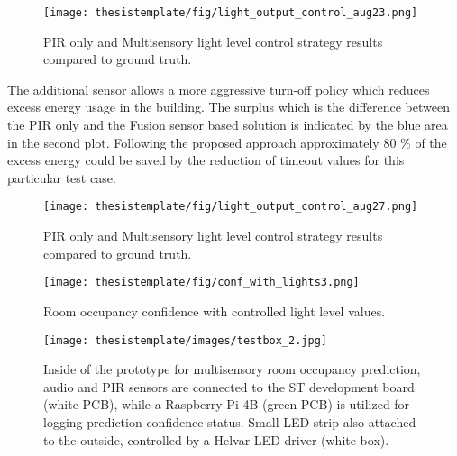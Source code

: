 \begin{figure}[ht!]
  \begin{center}
    \texttt{[image: thesistemplate/fig/light\_output\_control\_aug23.png]}
    \caption{PIR only and Multisensory light level control strategy results compared to ground truth.}
    \label{fig:light_output_comp}
  \end{center}
\end{figure}

The additional sensor allows a more aggressive turn-off policy which reduces excess energy usage in the building. The surplus which is the difference between the PIR only and the Fusion sensor based solution is indicated by the blue area in the second plot. Following the proposed approach approximately 80 \% of the excess energy could be saved by the reduction of timeout values for this particular test case.

\begin{figure}[ht!]
  \begin{center}
    \texttt{[image: thesistemplate/fig/light\_output\_control\_aug27.png]}
    \caption{PIR only and Multisensory light level control strategy results compared to ground truth.}
    \label{fig:light_output_comp}
  \end{center}
\end{figure}


\begin{figure}[h!]
  \begin{center}
    \texttt{[image: thesistemplate/fig/conf\_with\_lights3.png]}
    \caption{Room occupancy confidence with controlled light level values.}
    \label{fig:conf_with_lights}
  \end{center}
\end{figure}




\begin{figure}[ht!]
  \begin{center}
    \texttt{[image: thesistemplate/images/testbox\_2.jpg]}
    \caption{Inside of the prototype for multisensory room occupancy prediction, audio and PIR sensors are connected to the ST development board (white PCB), while a Raspberry Pi 4B (green PCB) is utilized for logging prediction confidence status. Small LED strip also attached to the outside, controlled by a Helvar LED-driver (white box).}
    \label{fig:testbox_inside}
  \end{center}
\end{figure}

